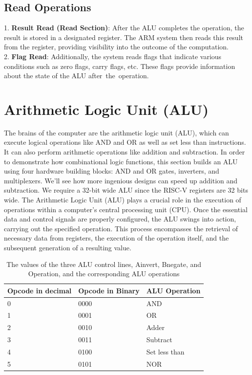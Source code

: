 \documentclass[a4paper,12pt,english]{report}
\begin{document}
\subsection{Read Operations} 

1. \textbf{Result Read (Read Section)}: After the ALU completes the operation, the result is stored in a designated register. The ARM system then reads this result from the register, providing visibility into the outcome of the computation.\\
2. \textbf{Flag Read}: Additionally, the system reads flags that indicate various conditions such as zero flags, carry flags, etc. These flags provide information about the state of the ALU after the operation.

\section{Arithmetic Logic Unit (ALU)}
The brains of the computer are the arithmetic logic unit (ALU), which can execute logical operations like AND and OR as well as set less than instructions. It can also perform arithmetic operations like addition and subtraction. In order to demonstrate how combinational logic functions, this section builds an ALU using four hardware building blocks: AND and OR gates, inverters, and multiplexers. We'll see how more ingenious designs can speed up addition and subtraction. We require a 32-bit wide ALU since the RISC-V registers are 32 bits wide. The Arithmetic Logic Unit (ALU) plays a crucial role in the execution of operations within a computer's central processing unit (CPU). Once the essential data and control signals are properly configured, the ALU swings into action, carrying out the specified operation. This process encompasses the retrieval of necessary data from registers, the execution of the operation itself, and the subsequent generation of a resulting value.
\begin{table}[h]
	\centering
	\begin{tabular}{|l|l|l|}
		\hline
		Opcode in decimal & Opcode in Binary & ALU Operation \\
		\hline
		0 & 0000 & AND \\
		1 & 0001 & OR \\
		2 &0010 & Adder \\
		3 & 0011 & Subtract \\
		4 & 0100 & Set less than \\
		5 & 0101 & NOR \\
		\hline
  
	\end{tabular}
 \caption{The values of the three ALU control lines, Ainvert, Bnegate, and Operation, and the corresponding ALU operations}
\end{table}
\end{document}
